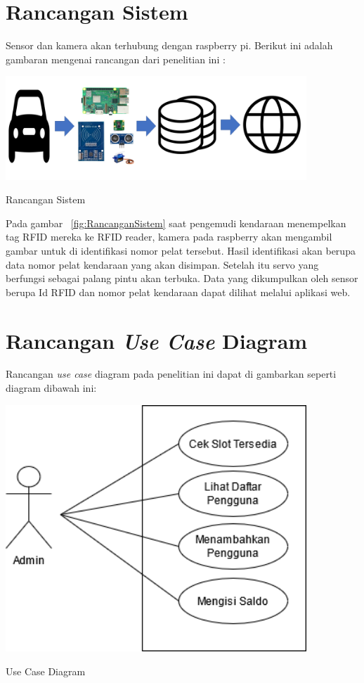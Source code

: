\section{Rancangan Sistem}
Sensor dan kamera akan terhubung dengan raspberry pi. Berikut ini adalah gambaran mengenai rancangan dari penelitian ini :\newline

\begin{afigure} 
    \includegraphics[width=0.85\textwidth, center]{images/rancangan sistem.png}
    \caption{Rancangan Sistem}
    \label{fig:RancanganSistem}
\end{afigure}

Pada gambar ~\ref{fig:RancanganSistem} saat pengemudi kendaraan menempelkan tag RFID mereka ke RFID reader, kamera pada raspberry akan mengambil gambar untuk di identifikasi nomor pelat tersebut. Hasil identifikasi akan berupa data nomor pelat kendaraan yang akan disimpan. Setelah itu servo yang berfungsi sebagai palang pintu akan terbuka. Data yang dikumpulkan oleh sensor berupa Id RFID dan nomor pelat kendaraan dapat dilihat melalui aplikasi web.

\section{Rancangan \textit{Use Case} Diagram}
Rancangan \textit{use case} diagram pada penelitian ini dapat di gambarkan seperti diagram dibawah ini:

\begin{afigure} 
    \includegraphics[width=0.85\textwidth, center]{images/Use Case Diagram revisi.png}
    \caption{Use Case Diagram}
    \label{fig:usecasediagram}
\end{afigure}

